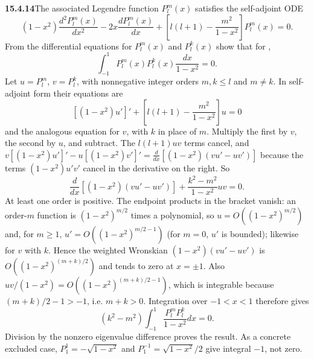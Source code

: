 \par\bigskip
\noindent\textbf{15.4.14}\quad The associated Legendre function
$P_{l}^{m}(x)$ satisfies the self-adjoint ODE
\[
(1-x^{2})\frac{d^{2}P_{l}^{m}(x)}{dx^{2}}-2x\frac{dP_{l}^{m}(x)}{dx}
+\left[l(l+1)-\frac{m^{2}}{1-x^{2}}\right]P_{l}^{m}(x)=0.
\]
From the differential equations for $P_{l}^{m}(x)$ and $P_{l}^{k}(x)$
show that for ,
\[
\int_{-1}^{1}P_{l}^{m}(x)P_{l}^{k}(x)\frac{dx}{1-x^{2}}=0.
\]
\solution
{}
Let $u=P_l^m$, $v=P_l^k$, with nonnegative integer orders
$m,k\le l$ and $m\ne k$. In self-adjoint form their equations are
\[
[(1-x^2)u']'+\left[l(l+1)-\frac{m^2}{1-x^2}\right]u=0
\]
and the analogous equation for $v$, with $k$ in place of $m$.
Multiply the first by $v$, the second by $u$, and subtract. The
$l(l+1)uv$ terms cancel, and
$v[(1-x^2)u']'-u[(1-x^2)v']'=\frac d{dx}[(1-x^2)(vu'-uv')]$ because
the terms $(1-x^2)u'v'$ cancel in the derivative on the right. So
\[
\frac d{dx}[(1-x^2)(vu'-uv')]
+\frac{k^2-m^2}{1-x^2}uv=0.
\]
At least one order is positive. The endpoint products in the bracket
vanish: an order-$m$ function is $(1-x^2)^{m/2}$ times a polynomial,
so $u=O((1-x^2)^{m/2})$ and, for $m\ge1$,
$u'=O((1-x^2)^{m/2-1})$ (for $m=0$, $u'$ is bounded); likewise for
$v$ with $k$. Hence the weighted Wronskian $(1-x^2)(vu'-uv')$ is
$O((1-x^2)^{(m+k)/2})$ and tends to zero at $x=\pm1$.
Also $uv/(1-x^2)=O((1-x^2)^{(m+k)/2-1})$, which is integrable
because $(m+k)/2-1>-1$, i.e. $m+k>0$.
Integration over $-1<x<1$ therefore gives
\[
(k^2-m^2)\int_{-1}^1\frac{P_l^mP_l^k}{1-x^2}dx=0.
\]
Division by the nonzero eigenvalue difference proves the result.
As a concrete excluded case,
$P_1^1=-\sqrt{1-x^2}$ and $P_1^{-1}=\sqrt{1-x^2}/2$ give
integral $-1$, not zero.

